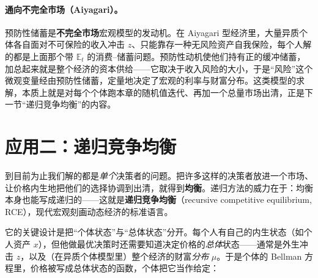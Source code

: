 \paragraph{通向不完全市场（Aiyagari）。}
预防性储蓄是\textbf{不完全市场}宏观模型的发动机。在 Aiyagari 型经济里，大量异质个体各自面对不可保险的收入冲击 $z$、只能靠存一种无风险资产自我保险，每个人解的都是上面那个带 $\mathbb{E}_t$ 的消费--储蓄问题。预防性动机使他们持有正的缓冲储蓄，加总起来就是整个经济的资本供给——它取决于收入风险的大小，于是``风险''这个微观变量经由预防性储蓄，定量地决定了宏观的利率与财富分布。这类模型的求解，本质上就是对每个个体跑本章的随机值迭代、再加一个总量市场出清，正是下一节``递归竞争均衡''的内容。

\section{应用二：递归竞争均衡}
\label{sec:stochdp-rce}

到目前为止我们解的都是\emph{单个}决策者的问题。把许多这样的决策者放进一个市场、让价格内生地把他们的选择协调到出清，就得到\textbf{均衡}。递归方法的威力在于：均衡本身也能写成递归的——这就是\textbf{递归竞争均衡}（recursive competitive equilibrium, RCE），现代宏观刻画动态经济的标准语言。

它的关键设计是把``个体状态''与``总体状态''分开。每个人有自己的内生状态（如个人资产 $x$），但他做最优决策时还需要知道决定价格的\emph{总体}状态——通常是外生冲击 $z$，以及（在异质个体模型里）整个经济的财富\emph{分布} $\mu$。于是个体的 Bellman 方程里，价格被写成总体状态的函数，个体把它当作给定：



